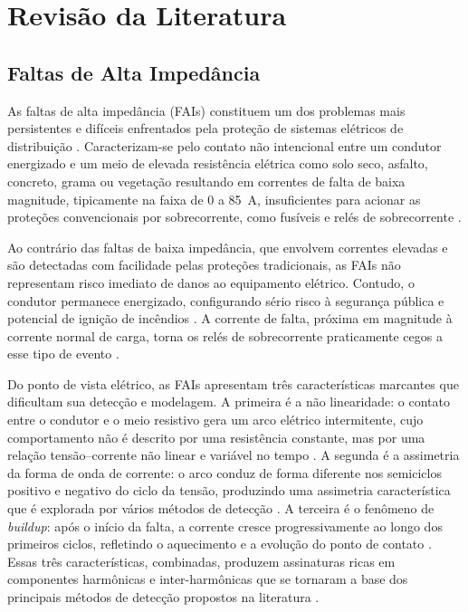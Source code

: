 %
%
\chapter{Revisão da Literatura}\label{chap:revbibliografica}

\section{Faltas de Alta Impedância}

As faltas de alta impedância (FAIs) constituem um dos problemas mais persistentes e
difíceis enfrentados pela proteção de sistemas elétricos de distribuição
\cite{2, 3}. Caracterizam-se pelo contato não intencional entre um condutor
energizado e um meio de elevada resistência elétrica como solo seco, asfalto,
concreto, grama ou vegetação resultando em correntes de falta de baixa magnitude,
tipicamente na faixa de 0 a 85~A, insuficientes para acionar as proteções convencionais
por sobrecorrente, como fusíveis e relés de sobrecorrente \cite{1, Aljohani2020}.

Ao contrário das faltas de baixa impedância, que envolvem correntes elevadas e são
detectadas com facilidade pelas proteções tradicionais, as FAIs não representam risco
imediato de danos ao equipamento elétrico. Contudo, o condutor permanece energizado,
configurando sério risco à segurança pública e potencial de ignição de incêndios
\cite{3, Sedighizadeh2010}. A corrente de falta, próxima em magnitude à corrente normal
de carga, torna os relés de sobrecorrente praticamente cegos a esse tipo de evento
\cite{Aljohani2020}.

Do ponto de vista elétrico, as FAIs apresentam três características marcantes que
dificultam sua detecção e modelagem. A primeira é a não linearidade: o contato entre o
condutor e o meio resistivo gera um arco elétrico intermitente, cujo comportamento não
é descrito por uma resistência constante, mas por uma relação tensão--corrente não
linear e variável no tempo \cite{Elkalashy2007, WangCui2022}. A segunda é a assimetria
da forma de onda de corrente: o arco conduz de forma diferente nos semiciclos positivo e
negativo do ciclo da tensão, produzindo uma assimetria característica que é explorada
por vários métodos de detecção \cite{4, 5}. A terceira é o fenômeno de
\textit{buildup}: após o início da falta, a corrente cresce progressivamente ao longo
dos primeiros ciclos, refletindo o aquecimento e a evolução do ponto de contato
\cite{4}. Essas três características, combinadas, produzem assinaturas ricas em
componentes harmônicas e inter-harmônicas que se tornaram a base dos principais métodos
de detecção propostos na literatura \cite{Macedo2015, 7}.


